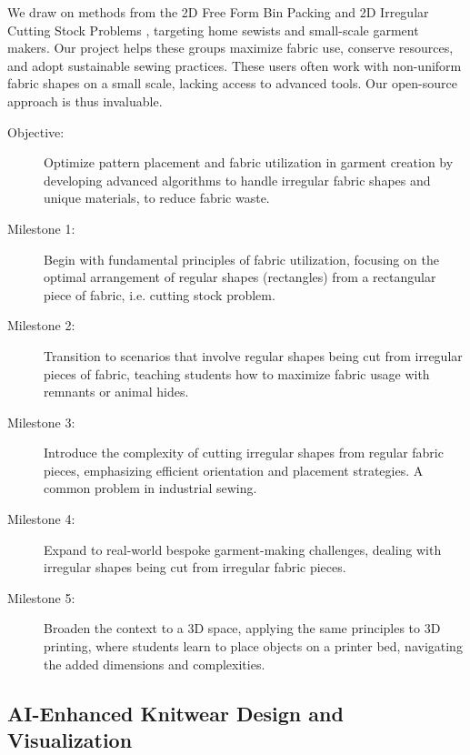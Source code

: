 \documentclass{article}
\begin{document}
    We draw on methods from the 2D Free Form Bin Packing and 2D Irregular Cutting Stock Problems
    \citep{bennell2009tutorial, xu2016efficient}, targeting home sewists and small-scale garment
    makers. Our project helps these groups maximize fabric use, conserve resources, and adopt
    sustainable sewing practices. These users often work with non-uniform fabric shapes on a
    small scale, lacking access to advanced tools. Our open-source approach is thus invaluable.

    \begin{description}
        \item[Objective:] Optimize pattern placement and fabric utilization in garment creation by developing
        advanced algorithms to handle irregular fabric shapes and unique materials, to reduce fabric waste.

        \item[Milestone 1:] Begin with fundamental principles of fabric utilization, focusing on the
        optimal arrangement of regular shapes (rectangles) from a rectangular piece of fabric, i.e. cutting stock
        problem.

        \item[Milestone 2:] Transition to scenarios that involve regular shapes being cut from irregular
        pieces of fabric, teaching students how to maximize fabric usage with remnants or animal hides.

        \item[Milestone 3:] Introduce the complexity of cutting irregular shapes from regular fabric
        pieces, emphasizing efficient orientation and placement strategies. A common problem in industrial sewing.

        \item[Milestone 4:] Expand to real-world bespoke garment-making challenges, dealing with irregular
        shapes being cut from irregular fabric pieces.

        \item[Milestone 5:] Broaden the context to a 3D space, applying the same principles to
        3D printing, where students learn to place objects on a printer bed, navigating the added
        dimensions and complexities.
    \end{description}


    \subsection{AI-Enhanced Knitwear Design and Visualization}
\end{document}
